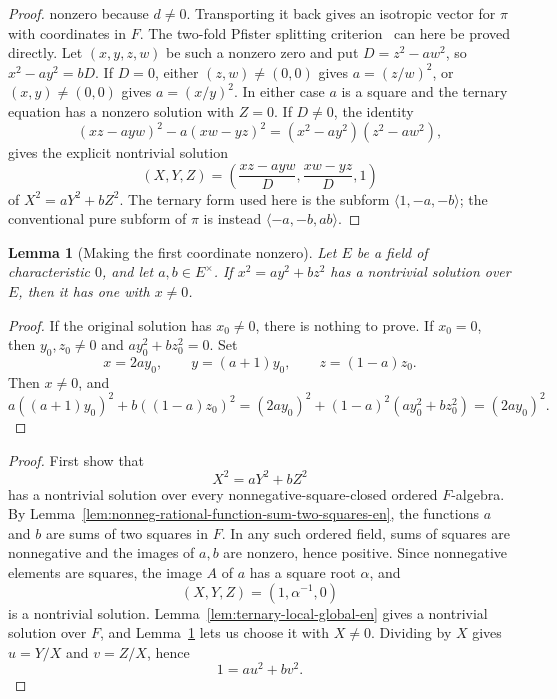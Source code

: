 \documentclass[uplatex,dvipdfmx]{jsarticle}
\newcommand{\restateprefix}{}
\theoremstyle{matrixsosdefinition}
\newtheorem{lemma}[theorem]{Lemma}
\begin{document}
\begin{proof}
  nonzero because \(d\ne0\). Transporting it back gives an isotropic vector for
  \(\pi\) with coordinates in \(F\).
  The two-fold Pfister splitting criterion~\cite{LamQuadraticForms} can here
  be proved directly.  Let \((x,y,z,w)\) be such a nonzero zero and put
  \(D=z^2-aw^2\), so \(x^2-ay^2=bD\).  If \(D=0\), either \((z,w)\ne(0,0)\)
  gives \(a=(z/w)^2\), or \((x,y)\ne(0,0)\) gives \(a=(x/y)^2\).
  In either case \(a\) is a square and the ternary equation has a nonzero
  solution with \(Z=0\).  If \(D\ne0\), the identity
  \[
    (xz-a y w)^2-a(xw-yz)^2=(x^2-a y^2)(z^2-a w^2),
  \]
  gives the explicit nontrivial solution
  \[
    (X,Y,Z)=\left(\frac{xz-ayw}{D},\frac{xw-yz}{D},1\right)
  \]
  of \(X^2=aY^2+bZ^2\).  The ternary form used here is the subform
  \(\langle1,-a,-b\rangle\); the conventional pure subform of \(\pi\)
  is instead \(\langle-a,-b,ab\rangle\).
\end{proof}

\begin{lemma}[Making the first coordinate nonzero]
\label{lem:first-coordinate-nonzero-en}
  Let \(E\) be a field of characteristic \(0\), and let \(a,b\in E^\times\).
  If \(x^2=ay^2+bz^2\) has a nontrivial solution over \(E\), then it has one
  with \(x\ne0\).
\end{lemma}

\begin{proof}
  If the original solution has \(x_0\ne0\), there is nothing to prove.  If
  \(x_0=0\), then \(y_0,z_0\ne0\) and \(a y_0^2+b z_0^2=0\).  Set
  \[
    x=2ay_0,\qquad y=(a+1)y_0,\qquad z=(1-a)z_0 .
  \]
  Then \(x\ne0\), and
  \[
    a((a+1)y_0)^2+b((1-a)z_0)^2
    =(2ay_0)^2+(1-a)^2(a y_0^2+b z_0^2)
    =(2ay_0)^2.
  \]
\end{proof}

{\renewcommand{\restateprefix}{Restated; }\binarySumTwoSquares*}

\begin{proof}
  First show that
  \[
    X^2=aY^2+bZ^2
  \]
  has a nontrivial solution over every nonnegative-square-closed ordered
  \(F\)-algebra. By
  Lemma~\ref{lem:nonneg-rational-function-sum-two-squares-en}, the functions
  \(a\) and \(b\) are sums of two squares in \(F\). In any such ordered field,
  sums of squares are nonnegative and the images of \(a,b\) are nonzero, hence
  positive. Since nonnegative elements are squares, the image \(A\) of \(a\)
  has a square root \(\alpha\), and
  \[
    (X,Y,Z)=(1,\alpha^{-1},0)
  \]
  is a nontrivial solution.
  Lemma~\ref{lem:ternary-local-global-en} gives a nontrivial solution over
  \(F\), and Lemma~\ref{lem:first-coordinate-nonzero-en} lets us choose it
  with \(X\ne0\). Dividing by \(X\) gives \(u=Y/X\) and \(v=Z/X\), hence
  \[
    1=au^2+bv^2.
  \]
\end{proof}
\end{document}

